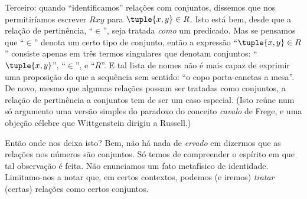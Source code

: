 \documentclass[../../../include/open-logic-section]{subfiles}
\begin{document}
Terceiro: quando ``identificamos'' relações com conjuntos, dissemos que nos
permitiríamos escrever $Rxy$ para $\tuple{x,y} \in R$. Isto está bem,
desde que a relação de pertinência, ``$\in$'', seja tratada \emph{como}
um predicado. Mas se pensamos que ``$\in$'' denota um certo tipo de
conjunto, então a expressão ``$\tuple{x,y} \in R$'' consiste apenas em
três termos singulares que denotam conjuntos: ``$\tuple{x,y}$'',
``$\in$'', e ``$R$''. E tal lista de nomes não é mais capaz de
exprimir uma proposição do que a sequência sem sentido: ``o copo porta-canetas
a mesa''. De novo, mesmo que algumas relações possam ser tratadas como conjuntos, a
relação de pertinência a conjuntos tem de ser um caso especial. (Isto reúne
num só argumento uma versão simples do paradoxo do conceito \emph{cavalo} de Frege, e
uma objeção célebre que Wittgenstein dirigiu a Russell.)

Então onde nos deixa isto? Bem, não há nada de \emph{errado} em
dizermos que as relações nos números são conjuntos. Só temos de
compreender o espírito em que tal observação é feita. Não enunciamos
um fato metafísico de identidade. Limitamo-nos a notar que, em certos
contextos, podemos (e iremos) \emph{tratar} (certas) relações como
certos conjuntos.
\end{document}
